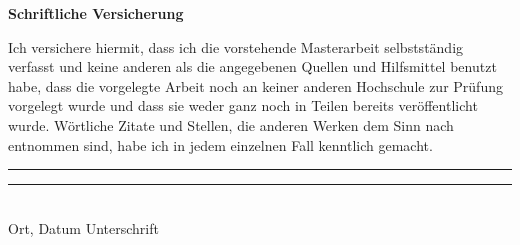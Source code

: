 \documentclass[a4paper,12pt]{article}
\begin{document}
\setcounter{page}{1}

\tableofcontents
\newpage


\newpage

\listoftables
\newpage

\listoffigures
\newpage



\setcounter{page}{1}













\newpage
\printbibliography[title={References}]

\newpage



\clearpage
\thispagestyle{empty}

\begin{center}
	\bf \Large Schriftliche Versicherung
\end{center}

\bigskip
\bigskip
\noindent Ich   versichere hiermit,   dass   ich   die   vorstehende   Masterarbeit selbstständig verfasst und keine anderen als die angegebenen Quellen und Hilfsmittel benutzt habe, dass die vorgelegte Arbeit noch an keiner anderen  Hochschule  zur  Prüfung  vorgelegt  wurde  und  dass  sie  weder ganz  noch  in  Teilen  bereits  veröffentlicht  wurde. Wörtliche Zitate und Stellen, die anderen Werken dem Sinn nach entnommen sind, habe ich in jedem einzelnen Fall kenntlich gemacht.
\newline
\newline
\newline

\noindent

\rule{5.5cm}{0.4pt} \phantom{ssssssssssssssssspace} \rule{5.5cm}{0.4pt}\\
\phantom{space}Ort, Datum \phantom{sssssssssssssssssssssssssssssssssssssspace} Unterschrift
\end{document}

